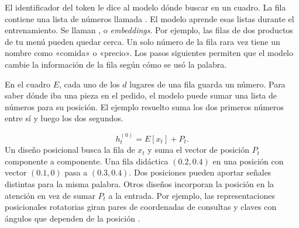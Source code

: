 {El identificador del token le dice al modelo dónde buscar en un cuadro. La fila contiene una lista de números llamada . El modelo aprende esas listas durante el entrenamiento. Se llaman , o \emph{embeddings}. Por ejemplo, las filas de dos productos de tu menú pueden quedar cerca. Un solo número de la fila rara vez tiene un nombre como «comida» o «precio». Los pasos siguientes permiten que el modelo cambie la información de la fila según cómo se usó la palabra.

En el cuadro \(E\), cada uno de los \(d\) lugares de una fila guarda un número. Para saber dónde iba una pieza en el pedido, el modelo puede sumar una lista de números para su posición. El ejemplo resuelto suma los dos primeros números entre sí y luego los dos segundos.}

\begin{equation}
 h_t^{(0)}=E[x_t]+P_t .
 \label{eq:embedding}
\end{equation}
{Un diseño posicional busca la fila de \(x_t\) y suma el vector de posición \(P_t\) componente a componente. Una fila didáctica \((0.2,0.4)\) en una posición con vector \((0.1,0)\) pasa a \((0.3,0.4)\). Dos posiciones pueden aportar señales distintas para la misma palabra. Otros diseños incorporan la posición en la atención en vez de sumar \(P_t\) a la entrada. Por ejemplo, las representaciones posicionales rotatorias giran pares de coordenadas de consultas y claves con ángulos que dependen de la posición \citep{transformer,rope}.}

